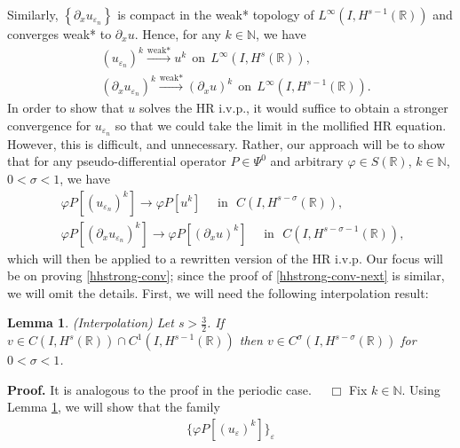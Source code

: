 \documentclass[12pt,reqno]{amsart}
\newcommand{\rr}{\mathbb{R}}
\newcommand{\p}{\partial}
\newcommand{\ee}{\varepsilon}
\newcommand{\vp}{\varphi}
\theoremstyle{plain}  %
\newtheorem{lemma}{Lemma}
\theoremstyle{definition}
\begin{document}
\begin{appendices}
		Similarly, $\left\{ \p_x u_{\ee_n} \right\}$ is compact in the
		weak* topology of $L^\infty(I, H^{s-1}(\rr))$ and converges weak*
		to $\p_x u$. Hence, for any $k \in \mathbb{N}$, we have
		\begin{align}
			\label{base-weak}
				& (u_{\ee_n})^k \xrightarrow{\text{weak*}} u^k \ \
				\text{on} \ \
				L^\infty(I, H^s(\rr)),
				\\
				\label{base-weak-2}
				& (\p_x u_{\ee_n})^k \xrightarrow{\text{weak*}} (\p_x u)^k
				\ \ \text{on} \ \
				L^\infty(I, H^{s-1}(\rr)). 
		\end{align}
		In order to show that $u$ solves the HR i.v.p., it would
		suffice to obtain a stronger convergence for  $u_{\ee_n}$ so that 
		we could take the limit in the mollified HR equation. However,
		this is difficult, and unnecessary. Rather, our approach will be to
		show that for any pseudo-differential operator
		$P \in \Psi^0$ and arbitrary $\vp \in S(\rr)$, $k \in
		\mathbb{N}$, $0< \sigma < 1$, we have
			\begin{align}
			\label{hhstrong-conv}
			& \varphi P [(u_{\ee_n})^k] \longrightarrow \varphi P [u^k]  
			\quad
			\text{ in } \,\,   C(I, H^{s-\sigma}(\rr)), \ \,
			\\
			\label{hhstrong-conv-next}
			& \varphi P [(\p_x u_{\ee_n})^k] \longrightarrow \varphi P
			[(\p_x u)^k]  
			\quad
			\text{ in } \,\,   C(I, H^{s-\sigma -1}(\rr)), \ \ 
		\end{align}
		which will then be applied to a rewritten version of the HR
		i.v.p. Our focus will be on proving \eqref{hhstrong-conv}; since the proof of
		\eqref{hhstrong-conv-next} is similar, we will omit the
		details. First, we will need the following
		interpolation result:
		\begin{lemma}
			\label{hhinterpolation-lem}
			(Interpolation)     Let  $s > \frac{3}{2}$.
			If $v \in C(I, H^s(\rr)) \cap C^1(I, H^{s-1}(\rr))$
			then $v \in C^\sigma (I, H^{s- \sigma}(\rr))$ for  $0 < \sigma < 1$.
		\end{lemma}
		{\bf Proof.} It is analogous to the proof in the periodic case.
		$\quad \Box$
		\vskip0.1in
		Fix $k \in \mathbb{N}$. Using Lemma \ref{hhinterpolation-lem}, we
		will show that the family
		\begin{equation*}
			\begin{split}
			 \{\varphi P[(u_\ee)^k]\}_\ee
		\end{split}

\end{equation*}
\end{appendices}
\end{document}
